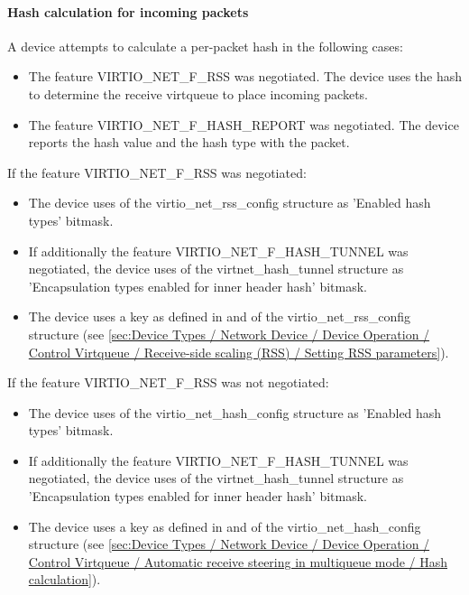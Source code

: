 \paragraph{Hash calculation for incoming packets}
\label{sec:Device Types / Network Device / Device Operation / Processing of Incoming Packets / Hash calculation for incoming packets}

A device attempts to calculate a per-packet hash in the following cases:
\begin{itemize}
\item The feature VIRTIO_NET_F_RSS was negotiated. The device uses the hash to determine the receive virtqueue to place incoming packets.
\item The feature VIRTIO_NET_F_HASH_REPORT was negotiated. The device reports the hash value and the hash type with the packet.
\end{itemize}

If the feature VIRTIO_NET_F_RSS was negotiated:
\begin{itemize}
\item The device uses  of the virtio_net_rss_config structure as 'Enabled hash types' bitmask.
\item If additionally the feature VIRTIO_NET_F_HASH_TUNNEL was negotiated, the device uses  of the
      virtnet_hash_tunnel structure as 'Encapsulation types enabled for inner header hash' bitmask.
\item The device uses a key as defined in  and  of the virtio_net_rss_config structure (see
\ref{sec:Device Types / Network Device / Device Operation / Control Virtqueue / Receive-side scaling (RSS) / Setting RSS parameters}).
\end{itemize}

If the feature VIRTIO_NET_F_RSS was not negotiated:
\begin{itemize}
\item The device uses  of the virtio_net_hash_config structure as 'Enabled hash types' bitmask.
\item If additionally the feature VIRTIO_NET_F_HASH_TUNNEL was negotiated, the device uses  of the
      virtnet_hash_tunnel structure as 'Encapsulation types enabled for inner header hash' bitmask.
\item The device uses a key as defined in  and  of the virtio_net_hash_config structure (see
\ref{sec:Device Types / Network Device / Device Operation / Control Virtqueue / Automatic receive steering in multiqueue mode / Hash calculation}).
\end{itemize}

